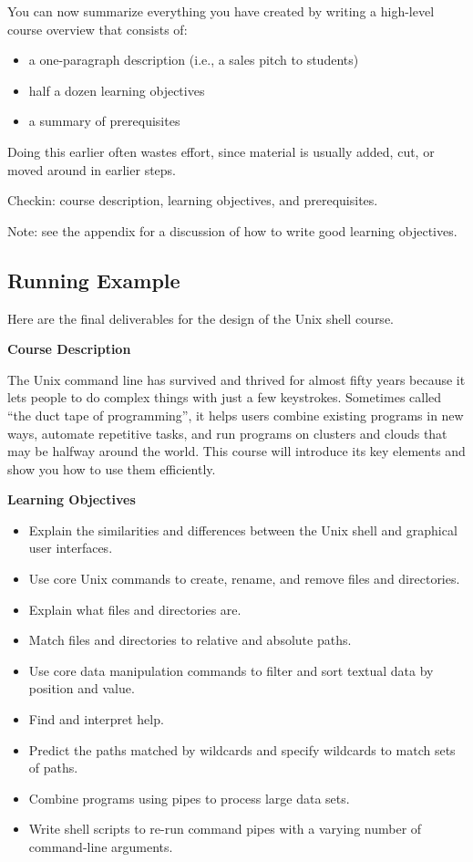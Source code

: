 \documentclass[10pt,statementpaper]{memoir}
\providecommand{\tightlist}{%
  \setlength{\itemsep}{0pt}\setlength{\parskip}{0pt}}
\begin{document}
You can now summarize everything you have created by writing a
high-level course overview that consists of:

\begin{itemize}
\tightlist
\item
  a one-paragraph description (i.e., a sales pitch to students)
\item
  half a dozen learning objectives
\item
  a summary of prerequisites
\end{itemize}

Doing this earlier often wastes effort, since material is usually added,
cut, or moved around in earlier steps.

Checkin: course description, learning objectives, and prerequisites.

Note: see the appendix for a discussion of how to write good learning
objectives.

\subsection{Running Example}\label{running-example-4}

Here are the final deliverables for the design of the Unix shell course.

\textbf{Course Description}

The Unix command line has survived and thrived for almost fifty years
because it lets people to do complex things with just a few keystrokes.
Sometimes called ``the duct tape of programming'', it helps users
combine existing programs in new ways, automate repetitive tasks, and
run programs on clusters and clouds that may be halfway around the
world. This course will introduce its key elements and show you how to
use them efficiently.

\textbf{Learning Objectives}

\begin{itemize}
\item
  Explain the similarities and differences between the Unix shell and
  graphical user interfaces.
\item
  Use core Unix commands to create, rename, and remove files and
  directories.
\item
  Explain what files and directories are.
\item
  Match files and directories to relative and absolute paths.
\item
  Use core data manipulation commands to filter and sort textual data by
  position and value.
\item
  Find and interpret help.
\item
  Predict the paths matched by wildcards and specify wildcards to match
  sets of paths.
\item
  Combine programs using pipes to process large data sets.
\item
  Write shell scripts to re-run command pipes with a varying number of
  command-line arguments.
\end{itemize}
\end{document}
